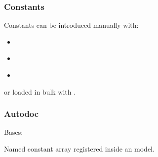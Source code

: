 \documentclass[letterpaper,10pt,english,openany,oneside]{sphinxmanual}
\begin{document}
\subsubsection{Constants}
\label{\detokenize{api/package/entities:constants}}
\sphinxAtStartPar
Constants can be introduced manually with:
\begin{itemize}
\item {} 
\sphinxAtStartPar
{\hyperref[\detokenize{api/package/object:nlpoptnet.api.NLPOptNet.matrix}]{}}

\item {} 
\sphinxAtStartPar
{\hyperref[\detokenize{api/package/object:nlpoptnet.api.NLPOptNet.vector}]{}}

\item {} 
\sphinxAtStartPar
{\hyperref[\detokenize{api/package/object:nlpoptnet.api.NLPOptNet.tensor}]{}}

\end{itemize}

\sphinxAtStartPar
or loaded in bulk with {\hyperref[\detokenize{api/package/object:nlpoptnet.api.NLPOptNet.extract}]{}}.


\subsubsection{Autodoc}
\label{\detokenize{api/package/entities:autodoc}}

\begin{fulllineitems}
\label{\detokenize{api/package/entities:nlpoptnet.api.Constant}}
\pysigstartsignatures
{}
\pysigstopsignatures
\sphinxAtStartPar
Bases: 

\sphinxAtStartPar
Named constant array registered inside an {\hyperref[\detokenize{api/package/object:nlpoptnet.api.NLPOptNet}]{}} model.

\end{fulllineitems}
\end{document}
